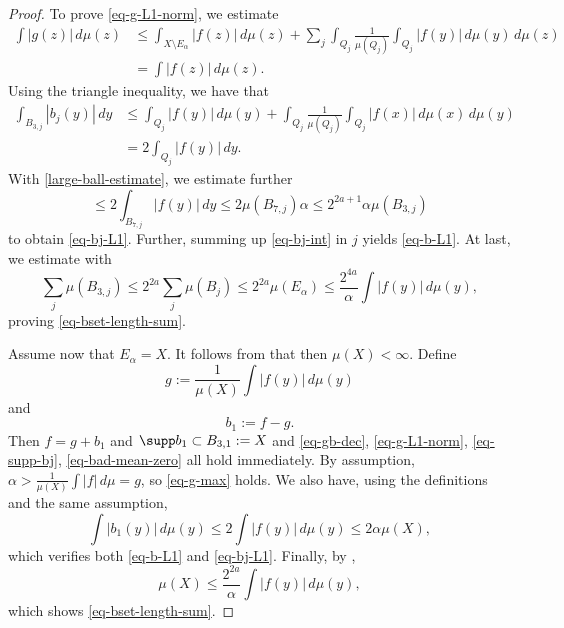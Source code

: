 \begin{proof}
To prove \eqref{eq-g-L1-norm}, we estimate
\begin{align*}
    \int |g(z)|\, d\mu(z) &\le \int_{X\setminus E_\alpha} |f(z)|\, d\mu(z) + \sum_{j} \int_{Q_j}\frac{1}{\mu(Q_j)}\int_{Q_j}|f(y)|\, d\mu(y)\,d\mu(z) \\
    &= \int |f(z)|\,d\mu(z).
\end{align*}
Using the triangle inequality, we have that
\begin{align}
    \label{eq-bj-int}
    \int_{B_{3,j}} |b_j(y)|\, dy &\le \int_{Q_j} |f(y)|\, d\mu(y) + \int_{Q_j} \frac{1}{\mu(Q_j)}\int_{Q_j} |f(x)|\, d\mu(x)\, d\mu(y) \\
    &= 2 \int_{Q_j} |f(y)|\, dy.
\end{align}
With \eqref{large-ball-estimate}, we estimate further
\begin{equation}
    \le 2 \int_{B_{7,j}} |f(y)|\, dy \le 2\mu(B_{7,j})\alpha \le 2^{2a+1} \alpha \mu(B_{3,j})
\end{equation}
to obtain \eqref{eq-bj-L1}.
Further, summing up \eqref{eq-bj-int} in $j$ yields \eqref{eq-b-L1}.
At last, we estimate with 
\begin{equation}
    \sum_j \mu(B_{3,j}) \le 2^{2a} \sum_j \mu(B_j) \le 2^{2a} \mu(E_\alpha) \le \frac{2^{4a}}{\alpha}\int |f(y)|\, d\mu(y),
\end{equation}
proving \eqref{eq-bset-length-sum}.

Assume now that $E_\alpha = X$. It follows from  that then $\mu(X)<\infty$.
Define
\begin{equation*}
    g := \frac{1}{\mu(X)} \int |f(y)|\,d\mu(y)
\end{equation*}
and
\begin{equation*}
    b_1 := f - g.
\end{equation*}
Then $f = g + b_1$ and $\supp b_1 \subset B_{3,1}:=X$ and \eqref{eq-gb-dec}, \eqref{eq-g-L1-norm}, \eqref{eq-supp-bj}, \eqref{eq-bad-mean-zero} all hold immediately. By assumption, $\alpha>\frac{1}{\mu(X)}\int |f|\,d\mu = g$, so \eqref{eq-g-max} holds.
We also have, using the definitions and the same assumption,
\begin{equation}
    \int |b_1(y)|\, d\mu(y) \le 2 \int |f(y)|\,d\mu(y) \le 2\alpha\mu(X),
\end{equation}
which verifies both \eqref{eq-b-L1} and \eqref{eq-bj-L1}.
Finally, by ,
\begin{equation*}
    \mu(X) \le \frac{2^{2a}}{\alpha} \int |f(y)|\,d\mu(y),
\end{equation*}
which shows \eqref{eq-bset-length-sum}.
\end{proof}


